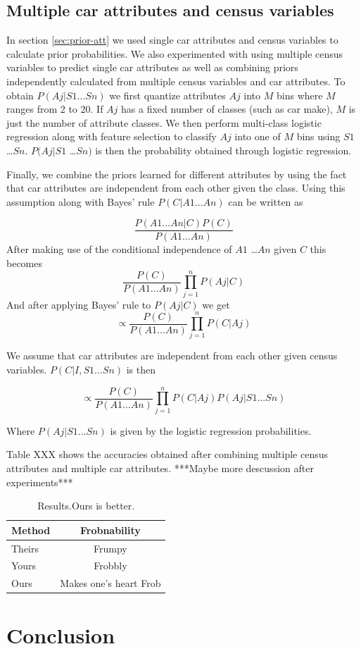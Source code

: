 \documentclass[10pt,twocolumn,letterpaper]{article}
\begin{document}
\subsection{Multiple car attributes and census variables}
In section \ref{sec:prior-att} we used single car attributes and census variables to calculate prior probabilities. We also experimented with using multiple census variables to predict single car attributes as well as combining priors independently calculated from multiple census variables and car attributes. To obtain \(P(Aj|S1...Sn)\) we first quantize attributes \(Aj\) into \(M\) bins where \(M\) ranges from 2 to 20. If \(Aj\) has a fixed number of classes (such as car make), \(M\) is just the number of attribute classes. We then perform multi-class logistic regression along with feature selection to classify \(Aj\) into one of \(M\) bins using \(S1\) \ldots \(Sn\). \(P(Aj|S1\) \ldots \(Sn)\) is then the probability obtained through logistic regression.

Finally, we combine the priors learned for different attributes by using the fact that car attributes are independent from each other given the class. Using this assumption along with Bayes’ rule \(P(C|A1 \ldots An)\) can be written as 

\begin{equation}
\frac{P(A1\ldots An|C)P(C)}{P(A1\ldots An)}
\end{equation}
After making use of the conditional independence of \(A1\) \ldots \(An\) given \(C\) this becomes
\begin{equation}
\frac{P(C)}{P(A1\ldots An)}\prod\limits_{j=1}^n P(Aj|C)
\end{equation}
And after applying Bayes’ rule to \(P(Aj|C)\) we get 
\begin{equation}
\propto \frac{P(C)}{P(A1\ldots An)}\prod\limits_{j=1}^n P(C|Aj)
\end{equation}

We assume that car attributes are independent from each other given census variables. \(P(C|I,S1 \ldots Sn)\) is then  

\begin{equation}
\propto \frac{P(C)}{P(A1\ldots An)}\prod\limits_{j=1}^n P(C|Aj)P(Aj|S1...Sn)
\end{equation}

Where \(P(Aj|S1...Sn)\) is given by the logistic regression probabilities.

Table XXX shows the accuracies obtained after combining multiple census attributes and multiple car attributes. ***Maybe more descussion after experiments***
\begin{table}
\begin{center}
\begin{tabular}{|l|c|}
\hline
Method & Frobnability \\
\hline\hline
Theirs & Frumpy \\
Yours & Frobbly \\
Ours & Makes one's heart Frob\\
\hline
\end{tabular}
\end{center}
\caption{Results.Ours is better.}
\label{table:prior-acc}
\end{table}

\section{Conclusion}
{\small


}
\end{document}
